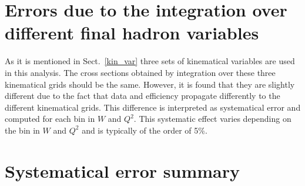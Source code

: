 \section{Errors due to the integration over different final hadron variables}
\label{integr}

As it is mentioned in Sect.~\ref{kin_var} three sets of kinematical variables are used in this analysis. The cross sections obtained by integration over these three kinematical grids should be the same. However, it is found that they are slightly different due to the fact that data and efficiency propagate differently to the different kinematical grids. This difference is interpreted as systematical error and computed for each bin in $W$ and $Q^{2}$. This systematic effect varies depending on the bin in $W$ and $Q^{2}$ and is typically of the order of 5\%.




\section{Systematical error summary}
\label{syssummary}

